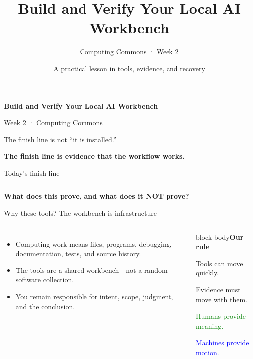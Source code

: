 \documentclass[aspectratio=169,11pt]{beamer}
\title{Build and Verify Your Local AI Workbench}\subtitle{Computing Commons · Week 2}\author{A practical lesson in tools, evidence, and recovery}\date{}
\begin{document}
\begin{frame}[plain]\vspace{1.2cm}\color{white}\LARGE\textbf{Build and Verify Your Local AI Workbench}\par\vspace{.35cm}\large\color{white!85}Week 2 · Computing Commons\par\vspace{1cm}\normalsize\color{white!75}The finish line is not “it is installed.”\par\color{white}\textbf{The finish line is evidence that the workflow works.}\end{frame}
\begin{frame}{Today's finish line}\begin{columns}[T]\end{columns}\vspace{.6cm}\begin{center}\Large\textcolor{gold!80!black}{\textbf{What does this prove, and what does it NOT prove?}}\end{center}\vfill\ladder\end{frame}
\begin{frame}{Why these tools? The workbench is infrastructure}\begin{columns}[T]\begin{itemize}\item Computing work means files, programs, debugging, documentation, tests, and source history.\item The tools are a shared workbench—not a random software collection.\item You remain responsible for intent, scope, judgment, and the conclusion.\end{itemize}\begin{beamercolorbox}[sep=.8em,wd=\linewidth]{block body}\textbf{Our rule}\par\vspace{.25cm}Tools can move quickly.\par Evidence must move with them.\par\vspace{.25cm}\textcolor{green}{Humans provide meaning.}\par\textcolor{blue}{Machines provide motion.}\end{beamercolorbox}\end{columns}\end{frame}
\end{document}
